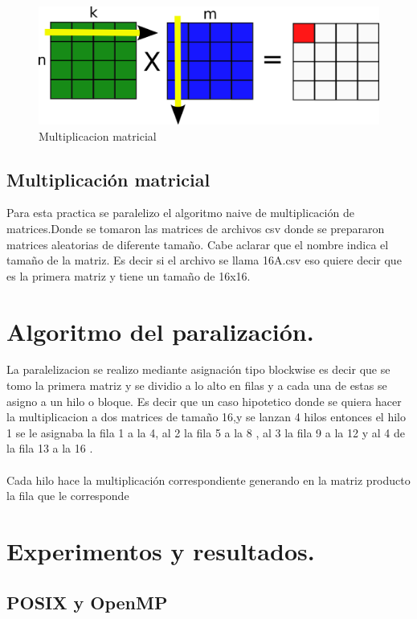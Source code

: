 \documentclass{IEEEtran}
\begin{document}
\begin{figure}[H]
  \includegraphics[width=\linewidth]{matrix.png}
  \caption{Multiplicacion matricial}
  \label{fig:boat1}
\end{figure}
\subsection{Multiplicación matricial}

Para esta practica se paralelizo el algoritmo naive de multiplicación de matrices.Donde se tomaron  las matrices
de archivos csv donde  se  prepararon  matrices aleatorias de diferente tamaño. Cabe aclarar que el nombre
indica el tamaño de la matriz. Es decir si el archivo se llama 16A.csv eso quiere decir que es la primera 
matriz y tiene  un  tamaño de  16x16.  

\section{Algoritmo del paralización.}
La paralelizacion se realizo mediante asignación tipo blockwise es decir que se tomo la primera  matriz y se dividio a lo alto en 
filas y a cada una de estas se asigno a un hilo o  bloque. Es decir que un caso hipotetico donde se quiera hacer la multiplicacion 
a dos matrices  de tamaño 16,y   se  lanzan 4 hilos entonces  el hilo 1 se le asignaba la fila 1 a la 4, al 2 la fila 5 a la 8
, al 3 la fila  9 a la  12  y al 4 de  la fila 13 a la 16 . \\\\
Cada hilo  hace  la  multiplicación correspondiente generando en la matriz  producto la  fila que le corresponde

\section{Experimentos y resultados.}
\subsection{POSIX y OpenMP}
\end{document}
